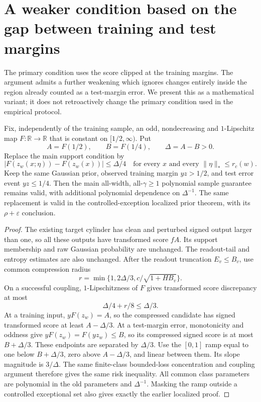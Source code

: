 \section{A weaker condition based on the gap between training and test margins}
\label{sec:margin-band-variant}

The primary condition uses the score clipped at the training margins.
The argument admits a further weakening which ignores changes entirely
inside the region already counted as a test-margin error. We present
this as a mathematical variant; it does not retroactively change the
primary condition used in the empirical protocol.

\begin{theorem}
\label{thm:monotone-score-transform}
Fix, independently of the training sample, an odd, nondecreasing and
$1$-Lipschitz map $F:\mathbb R\to\mathbb R$ that is constant on
$[1/2,\infty)$. Put
\[
 A=F(1/2),\qquad B=F(1/4),\qquad \Delta=A-B>0.
\]
Replace the main support condition by
\begin{equation}\label{eq:transformed-score-support}
 |F(z_w(x;\eta))-F(z_w(x))|\le\Delta/4
 \quad\text{for every }x\text{ and every }
       \|\eta\|_*\le r_c(w).
\end{equation}
Keep the same Gaussian prior, observed training margin $yz>1/2$,
and test error event $yz\le1/4$. Then the main all-width, all-$\gamma\ge1$
polynomial sample guarantee remains valid, with additional polynomial
dependence on $\Delta^{-1}$.
The same replacement is valid in the controlled-exception localized
prior theorem, with its $\rho+\varepsilon$ conclusion.
\end{theorem}

\begin{proof}
The existing target cylinder has clean and perturbed signed output
larger than one, so all these outputs have transformed score $fA$.
Its support membership and raw Gaussian probability are unchanged.
The readout-tail and entropy estimates are also unchanged.
After the readout truncation $E_v\le B_v$, use common compression radius
\[
 r=\min\{1,2\Delta/3,c/\sqrt{1+HB_v}\}.
\]
On a successful coupling, $1$-Lipschitzness of $F$ gives transformed
score discrepancy at most
\[
 \Delta/4+r/8\le\Delta/3.
\]
At a training input, $yF(z_w)=A$, so the compressed candidate has
signed transformed score at least $A-\Delta/3$. At a test-margin
error, monotonicity and oddness give
$yF(z_w)=F(yz_w)\le B$, so its compressed signed score is at most
$B+\Delta/3$. These endpoints are separated by $\Delta/3$.
Use the $[0,1]$ ramp equal to one below $B+\Delta/3$, zero above
$A-\Delta/3$, and linear between them. Its slope magnitude is
$3/\Delta$. The same finite-class bounded-loss concentration and
coupling argument therefore gives the same risk inequality.
All common class parameters are polynomial in the old parameters and
$\Delta^{-1}$. Masking the ramp outside a controlled exceptional set
also gives exactly the earlier localized proof.
\end{proof}

